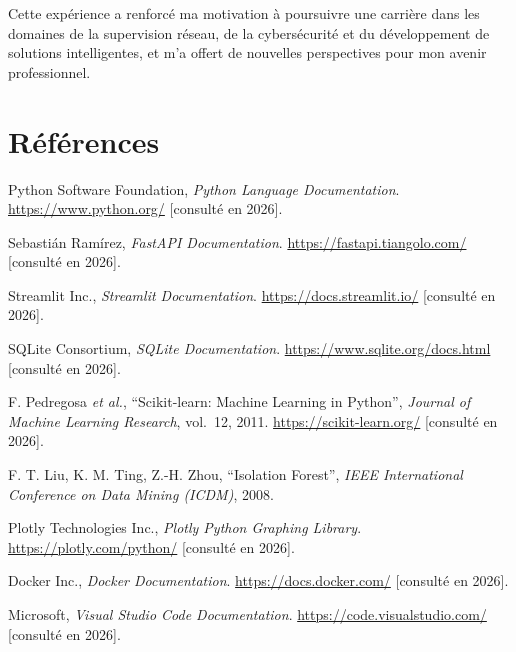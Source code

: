 \documentclass[12pt,a4paper]{report}
\begin{document}
Cette expérience a renforcé ma motivation à poursuivre une carrière dans les
domaines de la supervision réseau, de la cybersécurité et du développement de
solutions intelligentes, et m'a offert de nouvelles perspectives pour mon avenir
professionnel.

\chapter*{Références}

\begin{enumerate}[label={[\arabic*]}]
\item Python Software Foundation, \emph{Python Language Documentation}.
\url{https://www.python.org/} [consulté en 2026].
\item Sebastián Ramírez, \emph{FastAPI Documentation}.
\url{https://fastapi.tiangolo.com/} [consulté en 2026].
\item Streamlit Inc., \emph{Streamlit Documentation}.
\url{https://docs.streamlit.io/} [consulté en 2026].
\item SQLite Consortium, \emph{SQLite Documentation}.
\url{https://www.sqlite.org/docs.html} [consulté en 2026].
\item F. Pedregosa \emph{et al.}, \enquote{Scikit-learn: Machine Learning in
Python}, \emph{Journal of Machine Learning Research}, vol.~12, 2011.
\url{https://scikit-learn.org/} [consulté en 2026].
\item F. T. Liu, K. M. Ting, Z.-H. Zhou, \enquote{Isolation Forest},
\emph{IEEE International Conference on Data Mining (ICDM)}, 2008.
\item Plotly Technologies Inc., \emph{Plotly Python Graphing Library}.
\url{https://plotly.com/python/} [consulté en 2026].
\item Docker Inc., \emph{Docker Documentation}.
\url{https://docs.docker.com/} [consulté en 2026].
\item Microsoft, \emph{Visual Studio Code Documentation}.
\url{https://code.visualstudio.com/} [consulté en 2026].
\end{enumerate}
\end{document}
